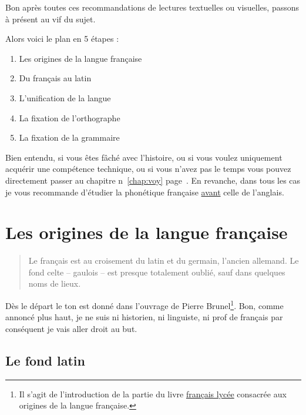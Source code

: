 Bon après toutes ces recommandations de lectures textuelles ou
visuelles, passons à présent au vif du sujet.\par

Alors voici le plan en 5 étapes :

\begin{enumerate}
\item Les origines de la langue française
\item Du français au latin
\item L'unification de la langue
\item La fixation de l'orthographe
\item La fixation de la grammaire
\end{enumerate}

Bien entendu, si vous êtes fâché avec l'histoire, ou si vous voulez
uniquement acquérir une compétence technique, ou si vous n'avez pas le
temps vous pouvez directement passer au chapitre n\no~\ref{chap:voy} page~\pageref{chap:voy}. En revanche,
dans tous les cas je vous recommande d'étudier la phonétique française
\underline{avant} celle de l'anglais.

\newpage
\minitoc
\newpage
\section{Les origines de la langue française}\label{sec:orgfr}

\begin{quote}
  Le français est au croisement du latin et du germain, l'ancien
  allemand. Le fond celte -- gaulois -- est presque totalement oublié,
  sauf dans quelques noms de lieux.
\end{quote}

Dès le départ le ton est donné dans l'ouvrage de Pierre
Brunel\footnote{Il s'agit de l'introduction  de la partie du livre \href{https://www.amazon.fr/gp/product/2844100015/ref=as\_li\_tl?ie=UTF8\&camp=1642\&creative=6746\&creativeASIN=2844100015\&linkCode=as2\&tag=wwwbecomefree-21\&linkId=985f3a849fd44728e8480993cf2d5490}{français
  lycée} consacrée aux origines de la langue française.}. Bon, comme
annoncé plus haut, je ne suis ni historien, ni linguiste, ni prof de
français par conséquent je vais aller droit au but.\par

\subsection{Le fond latin}\label{subsec:lat}

